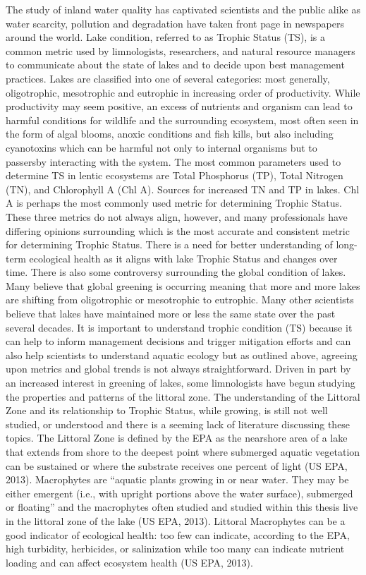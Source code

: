 \documentclass[
]{book}
\begin{document}
The study of inland water quality has captivated scientists and the public alike as water scarcity, pollution and degradation have taken front page in newspapers around the world. Lake condition, referred to as Trophic Status (TS), is a common metric used by limnologists, researchers, and natural resource managers to communicate about the state of lakes and to decide upon best management practices. Lakes are classified into one of several categories: most generally, oligotrophic, mesotrophic and eutrophic in increasing order of productivity. While productivity may seem positive, an excess of nutrients and organism can lead to harmful conditions for wildlife and the surrounding ecosystem, most often seen in the form of algal blooms, anoxic conditions and fish kills, but also including cyanotoxins which can be harmful not only to internal organisms but to passersby interacting with the system. The most common parameters used to determine TS in lentic ecosystems are Total Phosphorus (TP), Total Nitrogen (TN), and Chlorophyll A (Chl A). Sources for increased TN and TP in lakes. Chl A is perhaps the most commonly used metric for determining Trophic Status. These three metrics do not always align, however, and many professionals have differing opinions surrounding which is the most accurate and consistent metric for determining Trophic Status. There is a need for better understanding of long-term ecological health as it aligns with lake Trophic Status and changes over time.
There is also some controversy surrounding the global condition of lakes. Many believe that global greening is occurring meaning that more and more lakes are shifting from oligotrophic or mesotrophic to eutrophic. Many other scientists believe that lakes have maintained more or less the same state over the past several decades. It is important to understand trophic condition (TS) because it can help to inform management decisions and trigger mitigation efforts and can also help scientists to understand aquatic ecology but as outlined above, agreeing upon metrics and global trends is not always straightforward.
Driven in part by an increased interest in greening of lakes, some limnologists have begun studying the properties and patterns of the littoral zone. The understanding of the Littoral Zone and its relationship to Trophic Status, while growing, is still not well studied, or understood and there is a seeming lack of literature discussing these topics. The Littoral Zone is defined by the EPA as the nearshore area of a lake that extends from shore to the deepest point where submerged aquatic vegetation can be sustained or where the substrate receives one percent of light (US EPA, 2013). Macrophytes are ``aquatic plants growing in or near water. They may be either emergent (i.e., with upright portions above the water surface), submerged or floating'' and the macrophytes often studied and studied within this thesis live in the littoral zone of the lake (US EPA, 2013). Littoral Macrophytes can be a good indicator of ecological health: too few can indicate, according to the EPA, high turbidity, herbicides, or salinization while too many can indicate nutrient loading and can affect ecosystem health (US EPA, 2013).
\end{document}
